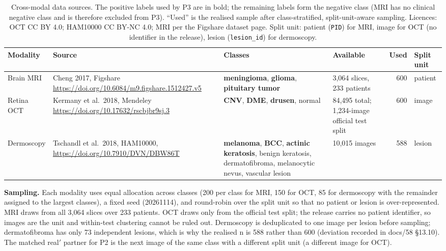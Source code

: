 \begin{table}[H]
\centering
\scriptsize
\setlength{\tabcolsep}{3pt}
\caption{Cross-modal data sources. The positive labels used by P3 are in bold; the
remaining labels form the negative class (MRI has no clinical negative class and is
therefore excluded from P3). ``Used'' is the realised sample after class-stratified,
split-unit-aware sampling. Licences: OCT CC BY 4.0; HAM10000 CC BY-NC 4.0; MRI per the
Figshare dataset page. Split unit: patient (\texttt{PID}) for MRI, image for OCT (no
identifier in the release), lesion (\texttt{lesion\_id}) for dermoscopy.}
\label{tab:crossmodal-data}
\begin{tabular}{p{1.45cm}p{3.9cm}p{3.2cm}p{2.6cm}rp{1.3cm}}
\toprule
Modality & Source & Classes & Available & Used & Split unit \\
\midrule
Brain MRI & Cheng 2017, Figshare \url{https://doi.org/10.6084/m9.figshare.1512427.v5} & \textbf{meningioma}, \textbf{glioma}, \textbf{pituitary tumor} & 3,064 slices, 233 patients & 600 & patient \\
Retina OCT & Kermany et al.\ 2018, Mendeley \url{https://doi.org/10.17632/rscbjbr9sj.3} & \textbf{CNV}, \textbf{DME}, \textbf{drusen}, normal & 84,495 total; 1,234-image official test split & 600 & image \\
Dermoscopy & Tschandl et al.\ 2018, HAM10000, \url{https://doi.org/10.7910/DVN/DBW86T} & \textbf{melanoma}, \textbf{BCC}, \textbf{actinic keratosis}, benign keratosis, dermatofibroma, melanocytic nevus, vascular lesion & 10,015 images & 588 & lesion \\
\bottomrule
\end{tabular}
\end{table}

\textbf{Sampling.} Each modality uses equal allocation across classes (200 per class for
MRI, 150 for OCT, 85 for dermoscopy with the remainder assigned to the largest classes), a
fixed seed (20261114), and round-robin over the split unit so that no patient or lesion is
over-represented. MRI draws from all 3,064 slices over 233 patients. OCT draws only from the
official test split; the release carries no patient identifier, so images are the unit and
within-test clustering cannot be ruled out. Dermoscopy is deduplicated to one image per
lesion before sampling; dermatofibroma has only 73 independent lesions, which is why the
realised n is 588 rather than 600 (deviation recorded in docs/58 \S13.10). The matched
real$'$ partner for P2 is the next image of the same class with a different split unit (a
different image for OCT).

